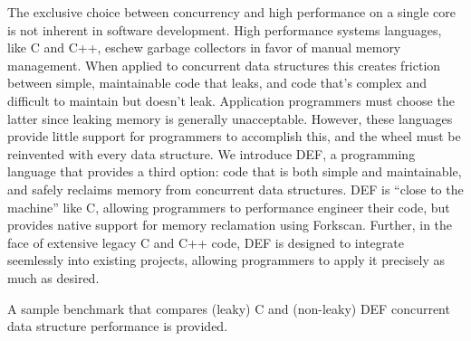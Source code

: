 The exclusive choice between concurrency and high performance on a single core is not inherent in software development.  High performance systems languages, like C and C++, eschew garbage collectors in favor of manual memory management.  When applied to concurrent data structures this creates friction between simple, maintainable code that leaks, and code that's complex and difficult to maintain but doesn't leak.  Application programmers must choose the latter since leaking memory is generally unacceptable.  However, these languages provide little support for programmers to accomplish this, and the wheel must be reinvented with every data structure.  We introduce DEF, a programming language that provides a third option: code that is both simple and maintainable, and safely reclaims memory from concurrent data structures.  DEF is ``close to the machine'' like C, allowing programmers to performance engineer their code, but provides native support for memory reclamation using Forkscan.  Further, in the face of extensive legacy C and C++ code, DEF is designed to integrate seemlessly into existing projects, allowing programmers to apply it precisely as much as desired.

A sample benchmark that compares (leaky) C and (non-leaky) DEF concurrent data structure performance is provided.
